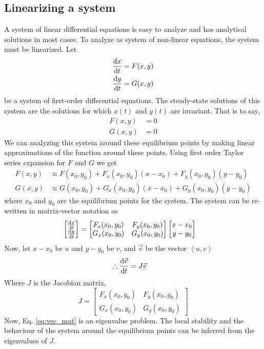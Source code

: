 \documentclass[11pt,1in]{article}
\begin{document}
\subsection{Linearizing a system}
A system of linear differential equations is easy to analyze and has analytical solutions in most cases. To analyze as system of non-linear equations, the system must be linearized. 
Let 
\begin{align}
\derivative{x}{t} &= F(x, y) \\
\derivative{y}{t} &= G(x , y)
\end{align}
be a system of first-order differential equations. The steady-state solutions of this system are the solutions for which  $x(t)$ and $y(t)$ are invariant. That is to say,
\begin{align}
    F(x,y) &= 0 \\
    G(x,y) &= 0
\end{align}
We can analyzing this system around these equilibrium points by making linear approximations of the function around these points. Using first order Taylor series expansion for $F$ and $G$ we get
\begin{align}
    F(x,y) &\approx F(x_0, y_0) + F_x(x_0, y_0)(x - x_0) + F_y(x_0, y_0)(y - y_0) \\
    G(x,y) &\approx G(x_0, y_0) + G_x(x_0, y_0)(x - x_0) + G_y(x_0, y_0)(y - y_0)
\end{align}
where $x_0$ and $y_0$ are the equilibrium points for the system. The system can be re-written in matrix-vector notation as 
\begin{align}
    \begin{bmatrix}
    \derivative{x}{t} \\
    \derivative{y}{t}
    \end{bmatrix} &= 
    \begin{bmatrix}
    F_x(x_0, y_0) & F_y(x_0, y_0)\\
    G_x(x_0, y_0) & G_y(x_0, y_0)
    \end{bmatrix}
    \begin{bmatrix}
    x - x_0 \\
    y - y_0
    \end{bmatrix}
\end{align}Now, let $x - x_0$ be $u$ and $y - y_0$ be $v$, and $\Vec{v}$ be the vector $\left<u ,v\right>$
\begin{align}
    \therefore \derivative{\Vec{v}}{t} &= J\Vec{v} \label{eq:vec_mat}
\end{align}
Where $J$ is the Jacobian matrix, $$J = \begin{bmatrix}
    F_x(x_0, y_0) & F_y(x_0, y_0)\\
    G_x(x_0, y_0) & G_y(x_0, y_0)
    \end{bmatrix}$$
Now, Eq. \ref{eq:vec_mat} is an eigenvalue problem. The local stability and the behaviour of the system around the equilibrium points can be inferred from the eigenvalues of $J$. 
\end{document}
